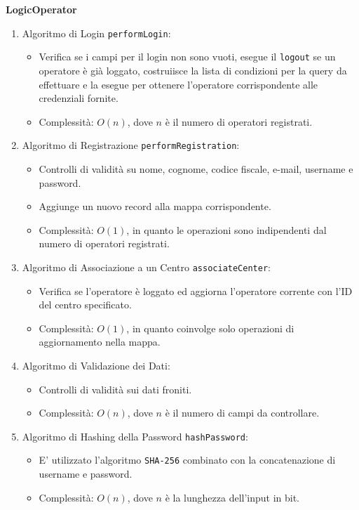 \textbf{LogicOperator}
\begin{enumerate}
    \item Algoritmo di Login \texttt{performLogin}:
    \begin{itemize}
        \item Verifica se i campi per il login non sono vuoti, esegue il \texttt{logout} se un operatore è già loggato, costruiisce la lista di condizioni per la query da effettuare
        e la esegue per ottenere l'operatore corrispondente alle credenziali fornite.
        \item Complessità: $O(n)$, dove $n$ è il numero di operatori registrati.
    \end{itemize}
    \item Algoritmo di Registrazione \texttt{performRegistration}:
    \begin{itemize}
        \item Controlli di validità su nome, cognome, codice fiscale, e-mail, username e password.
        \item Aggiunge un nuovo record alla mappa corrispondente.
        \item Complessità: $O(1)$, in quanto le operazioni sono indipendenti dal numero di operatori registrati.
    \end{itemize}
    \item Algoritmo di Associazione a un Centro \texttt{associateCenter}:
    \begin{itemize}
        \item Verifica se l'operatore è loggato ed aggiorna l'operatore corrente con l'ID del centro specificato.
        \item Complessità: $O(1)$, in quanto coinvolge solo operazioni di aggiornamento nella mappa.
    \end{itemize}
    \item Algoritmo di Validazione dei Dati:
    \begin{itemize}
        \item Controlli di validità sui dati froniti.
        \item Complessità: $O(n)$, dove $n$ è il numero di campi da controllare.
    \end{itemize}
    \item Algoritmo di Hashing della Password \texttt{hashPassword}:
    \begin{itemize}
        \item E' utilizzato l'algoritmo \texttt{SHA-256} combinato con la concatenazione di username e password.
        \item Complessità: $O(n)$, dove $n$ è la lunghezza dell'input in bit.
    \end{itemize}
\end{enumerate}

